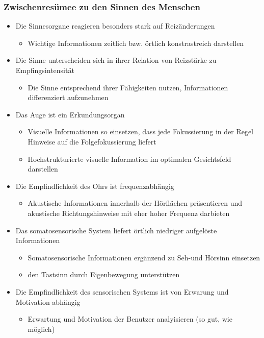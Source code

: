 \documentclass[paper=a4, fontsize=11pt]{scrartcl} %
\numberwithin{equation}{section} %
\numberwithin{figure}{section} %
\numberwithin{table}{section} %
\begin{document}
\subsubsection{Zwischenresümee zu den Sinnen des Menschen}

\begin{itemize}
\item Die Sinnesorgane reagieren besonders stark auf Reizänderungen
\begin{itemize}
\item Wichtige Informationen zeitlich bzw. örtlich konstrastreich darstellen
\end{itemize}
\item Die Sinne unterscheiden sich in ihrer Relation von Reizstärke zu Empfingsintensität
\begin{itemize}
\item Die Sinne entsprechend ihrer Fähigkeiten nutzen, Informationen differenziert aufzunehmen
\end{itemize}
\item Das Auge ist ein Erkundungsorgan
\begin{itemize}
\item Visuelle Informationen so einsetzen, dass jede Fokussierung in der Regel Hinweise auf die Folgefokussierung liefert
\item Hochstrukturierte visuelle Information im optimalen Gesichtsfeld darstellen
\end{itemize}
\item Die Empfindlichkeit des Ohrs ist frequenzabhängig
\begin{itemize}
\item Akustische Informationen innerhalb der Hörflächen präsentieren und akustische Richtungshinweise mit eher hoher Frequenz darbieten
\end{itemize}
\item Das somatosensorische System liefert örtlich niedriger aufgelöste Informationen
\begin{itemize}
\item Somatosensorische Informationen ergänzend zu Seh-und Hörsinn einsetzen
\item den Tastsinn durch Eigenbewegung unterstützen
\end{itemize}
\item Die Empfindlichkeit des sensorischen Systems ist von Erwarung und Motivation abhängig
\begin{itemize}
\item Erwartung und Motivation der Benutzer analyisieren (so gut, wie möglich)
\end{itemize}
\end{itemize}
\end{document}
